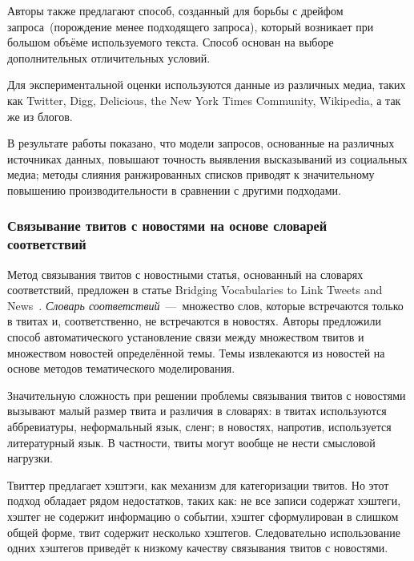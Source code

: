         Авторы также предлагают способ, созданный для борьбы с дрейфом запроса~(порождение менее подходящего запроса), который возникает при большом объёме используемого текста.
        Способ основан на выборе дополнительных отличительных условий.

        Для экспериментальной оценки используются данные из различных медиа, таких как Twitter, Digg, Delicious, the New York Times Community, Wikipedia, а так же из блогов.

        В результате работы показано, что модели запросов, основанные на различных источниках данных, повышают точность выявления высказываний из социальных медиа;
        методы слияния ранжированных списков приводят к значительному повышению производительности в сравнении с другими подходами.

    \subsubsection{Связывание твитов с новостями на основе словарей соответствий}
        Метод связывания твитов с новостными статья, основанный на словарях соответствий, предложен в статье Bridging Vocabularies to Link Tweets and News~\cite{bridging}. \textit{Словарь соответствий}~---~множество слов,
        которые встречаются только в твитах и, соответственно, не встречаются в новостях.
        Авторы предложили способ автоматического установление связи между множеством твитов и множеством новостей определённой темы.
        Темы извлекаются из новостей на основе методов тематического моделирования.

        Значительную сложность при решении проблемы связывания твитов с новостями вызывают малый размер твита и различия в словарях: в твитах используются аббревиатуры,
        неформальный язык, сленг; в новостях, напротив, используется литературный язык.
        В частности, твиты могут вообще не нести смысловой нагрузки.

        Твиттер предлагает хэштэги, как механизм для категоризации твитов.
        Но этот подход обладает рядом недостатков, таких как: не все записи содержат хэштеги, хэштег не содержит информацию о событии, хэштег сформулирован в слишком общей форме,
        твит содержит несколько хэштегов.
        Следовательно использование одних хэштегов приведёт к низкому качеству связывания твитов с новостями.

